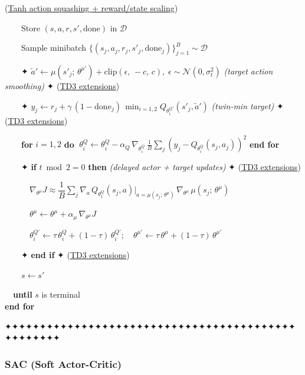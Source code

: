 \documentclass[11pt]{article}
\begin{document}
\begin{pseudobox}
(\hyperref[trick-4-5-3]{Tanh action squashing + reward/state scaling})\\
\strut ~~~~Store \((s, a, r, s', \text{done})\) in \(\mathcal{D}\)\\
\strut ~~~~Sample minibatch
\(\{(s_j, a_j, r_j, s'_j, \text{done}_j)\}_{j=1}^{B} \sim \mathcal{D}\)\\
\strut ~~~~✦
\(\tilde{a}' \leftarrow \mu(s'_j;\,\theta^{\mu'}) + \mathrm{clip}(\epsilon,\, -c,\, c),\;\epsilon\sim\mathcal{N}(0,\sigma_t^2)\)
\emph{(target action smoothing)} ✦ (\hyperref[trick-4-5-4]{TD3
extensions})\\
\strut ~~~~✦
\(y_j \leftarrow r_j + \gamma\,(1-\text{done}_j)\,\min_{i=1,2} Q_{\theta_i^{Q'}}(s'_j, \tilde{a}')\)
\emph{(twin-min target)} ✦ (\hyperref[trick-4-5-4]{TD3 extensions})\\
\strut ~~~~\textbf{for} \(i = 1, 2\) \textbf{do}
\(\;\theta_i^Q \leftarrow \theta_i^Q - \alpha_Q\,\nabla_{\theta_i^Q}\,\frac{1}{B}\sum_j(y_j - Q_{\theta_i^Q}(s_j,a_j))^2\)
\textbf{end for}\\
\strut ~~~~✦ \textbf{if} \(t \bmod 2 = 0\) \textbf{then} \emph{(delayed
actor + target updates)} ✦ (\hyperref[trick-4-5-4]{TD3 extensions})\\
\strut ~~~~~~\(\nabla_{\theta^{\mu}} J \approx \dfrac{1}{B} \sum_j \nabla_a\, Q_{\theta_1^Q}(s_j, a)\bigr|_{a = \mu(s_j;\, \theta^{\mu})}\, \nabla_{\theta^{\mu}}\, \mu(s_j;\, \theta^{\mu})\)\\
\strut ~~~~~~\(\theta^{\mu} \leftarrow \theta^{\mu} + \alpha_\mu\, \nabla_{\theta^{\mu}} J\)\\
\strut ~~~~~~\(\theta_i^{Q'} \leftarrow \tau\, \theta_i^Q + (1 - \tau)\, \theta_i^{Q'};\quad \theta^{\mu'} \leftarrow \tau\, \theta^{\mu} + (1 - \tau)\, \theta^{\mu'}\)\\
\strut ~~~~✦ \textbf{end if} ✦ (\hyperref[trick-4-5-4]{TD3
extensions})\\
\strut ~~~~\(s \leftarrow s'\)\\
\strut ~~\textbf{until} \(s\) is terminal\\
\textbf{end for}

\end{pseudobox}

    ✦✦✦✦✦✦✦✦✦✦✦✦✦✦✦✦✦✦✦✦✦✦✦✦✦✦✦✦✦✦✦✦✦✦✦✦✦✦✦✦✦✦✦✦✦✦✦✦✦✦

    \clearpage

\label{sac}

    \subsubsection{SAC (Soft Actor-Critic)}\label{sac-soft-actor-critic}
\end{document}
